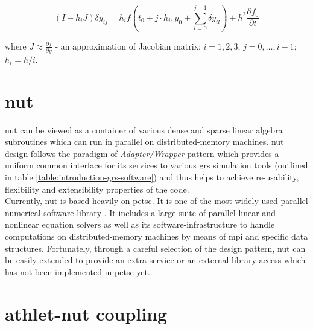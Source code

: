  \begin{equation} \label{eq:athlet-9}
        (I - h_{i}J)\delta y_{ij} = h_{i} f(t_{0} + j \cdot h_{i}, y_{0} + \sum^{j-1}_{l = 0} \delta y_{il}) + h^{2} \frac{\partial f_{0}}{\partial t}
    \end{equation}

where $J \approx \frac{\partial f}{\partial y}$ - an approximation of Jacobian matrix; $i = 1, 2, 3$; $j=0, \dots, i - 1$; $h_{i} = h / i$.



\section{\acrshort{nut}}

\acrfull{nut} can be viewed as a container of various dense and sparse linear algebra subroutines which can run in parallel on distributed-memory machines. \acrshort{nut} design follows the paradigm of \textit{Adapter/Wrapper} pattern which provides a uniform common interface for its services to various \acrshort{grs} simulation tools (outlined in table \ref{table:introduction-grs-software}) and thus helps to achieve re-usability, flexibility and extensibility properties of the code.\\


Currently, \acrshort{nut} is based heavily on \acrfull{petsc}. It is one of the most widely used parallel numerical software  library \cite{wiki:petsc-general-info}. It includes a large suite of parallel linear and nonlinear equation solvers as well as its software-infrastructure to handle computations on distributed-memory machines by means of \acrfull{mpi} and specific data structures. Fortunately, through a careful selection of the design pattern, \acrshort{nut} can be easily extended to provide an extra service or an external library access which has not been implemented in \acrshort{petsc} yet.\\ 


\section{\acrshort{athlet}-\acrshort{nut} coupling}
\label{sec:athlet-nut-coupling}

